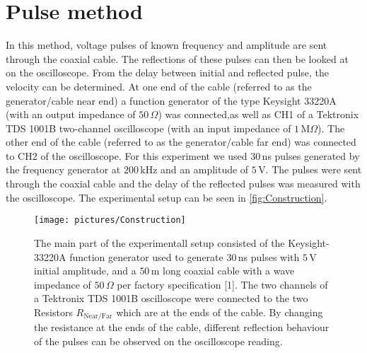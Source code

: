 \documentclass[a4paper,10pt,twocolumn]{article}
\begin{document}
    \section{Pulse method}
    In this method, voltage pulses of known frequency and amplitude are sent through the coaxial cable.
    The reflections of these pulses can then be looked at on the oscilloscope.
    From the delay between initial and reflected pulse, the velocity can be determined.
    At one end of the cable (referred to as the generator/cable near end) a function generator of the type Keysight 33220A (with an output impedance of $50\,\Omega$)
    was connected,as well as CH1 of a Tektronix TDS 1001B two-channel oscilloscope
    (with an input impedance of $1\,\text{M}\Omega$).
    The other end of the cable (referred to as the generator/cable far end) was connected to CH2 of the oscilloscope.
    For this experiment we used $30\,$ns pulses generated by the frequency generator at $200\,$kHz and an amplitude of $5\,$V\@.
    The pulses were sent through the coaxial cable and the delay of the reflected pulses was measured with the oscilloscope.
    The experimental setup can be seen in \autoref{fig:Construction}.
    \label{sec:propagationVelocities}
    \begin{figure}[htbp]                                 %
        \begin{center}                                       %
            \texttt{[image: pictures/Construction]}      %
            \caption[]{The main part of the experimentall setup consisted of the Keysight-33220A function generator used to generate $30\,$ns pulses with $5\,$V initial amplitude, and a $50\,$m long
            coaxial cable with a wave impedance of $50\,\Omega$ per factory specification [1].
            The two channels of a Tektronix TDS 1001B oscilloscope were connected to the two Resistors $R_{\text{Near/Far}}$ which are at the ends of the cable.
            By changing the resistance at the ends of the cable, different reflection behaviour of the pulses can be observed on the oscilloscope reading.
            }   %
            \label{fig:Construction}                                      %
        \end{center}
    \end{figure}
\end{document}
